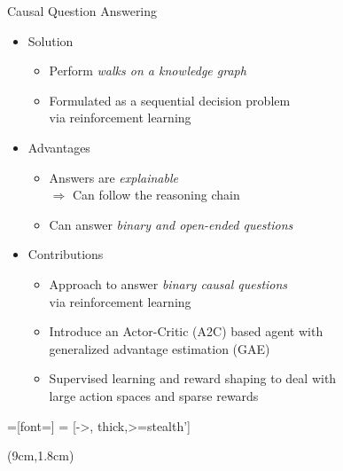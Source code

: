 \documentclass[table]{beamer}
\begin{document}
\begin{frame}{Causal Question Answering}
  \begin{itemize}
    \item<1-> Solution
    \begin{itemize}
      \item Perform \emph{walks on a knowledge graph}
      \item Formulated as a sequential decision problem\\via reinforcement learning
    \end{itemize}
    \item<2-> Advantages
    \begin{itemize}
      \item Answers are \emph{explainable}\\$\Rightarrow$ Can follow the reasoning chain
      \item Can answer \emph{binary and open-ended questions}
    \end{itemize}
    \item<3-> Contributions
    \begin{itemize}
      \item Approach to answer \emph{binary causal questions}\\via reinforcement learning
      \item Introduce an Actor-Critic (A2C) based agent with\\generalized advantage estimation (GAE)
      \item Supervised learning and reward shaping to deal with\\large action spaces and sparse rewards
    \end{itemize}
  \end{itemize}
  \tikzset{>=triangle 45}
  \tikzset{every picture/.style=thick}
  =[font=\small]
     = [->, thick,>=stealth']

  \begin{textblock*}{5cm}(9cm,1.8cm) 
\end{textblock*}
\end{frame}
\end{document}
